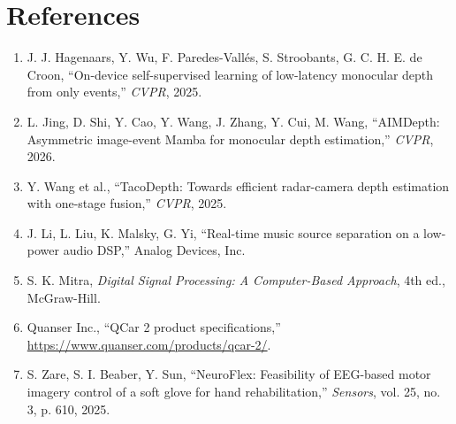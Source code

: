 \documentclass[11pt,a4paper]{article}
\begin{document}
\section{References}

\begin{enumerate}
\item J. J. Hagenaars, Y. Wu, F. Paredes-Vall\'es, S. Stroobants, G. C. H. E. de Croon, ``On-device self-supervised learning of low-latency monocular depth from only events,'' \emph{CVPR}, 2025.
\item L. Jing, D. Shi, Y. Cao, Y. Wang, J. Zhang, Y. Cui, M. Wang, ``AIMDepth: Asymmetric image-event Mamba for monocular depth estimation,'' \emph{CVPR}, 2026.
\item Y. Wang et al., ``TacoDepth: Towards efficient radar-camera depth estimation with one-stage fusion,'' \emph{CVPR}, 2025.
\item J. Li, L. Liu, K. Malsky, G. Yi, ``Real-time music source separation on a low-power audio DSP,'' Analog Devices, Inc.
\item S. K. Mitra, \emph{Digital Signal Processing: A Computer-Based Approach}, 4th ed., McGraw-Hill.
\item Quanser Inc., ``QCar 2 product specifications,'' \url{https://www.quanser.com/products/qcar-2/}.
\item S. Zare, S. I. Beaber, Y. Sun, ``NeuroFlex: Feasibility of EEG-based motor imagery control of a soft glove for hand rehabilitation,'' \emph{Sensors}, vol. 25, no. 3, p. 610, 2025.
\end{enumerate}
\end{document}
